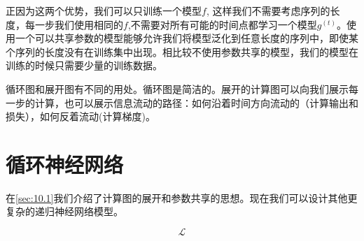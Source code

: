 正因为这两个优势，我们可以只训练一个模型$f$, 这样我们不需要考虑序列的长度，每一步我们使用相同的$f$,不需要对所有可能的时间点都学习一个模型$g^{(t)}$。使用一个可以共享参数的模型能够允许我们将模型泛化到任意长度的序列中，即使某个序列的长度没有在训练集中出现。相比较不使用参数共享的模型，我们的模型在训练的时候只需要少量的训练数据。

循环图和展开图有不同的用处。循环图是简洁的。展开的计算图可以向我们展示每一步的计算，也可以展示信息流动的路径：如何沿着时间方向流动的（计算输出和损失），如何反着流动(计算梯度)。

\section{循环神经网络}
\label{sec:10.2}
在\ref{sec:10.1}我们介绍了计算图的展开和参数共享的思想。现在我们可以设计其他更复杂的递归神经网络模型。

$$\mathcal{L}$$